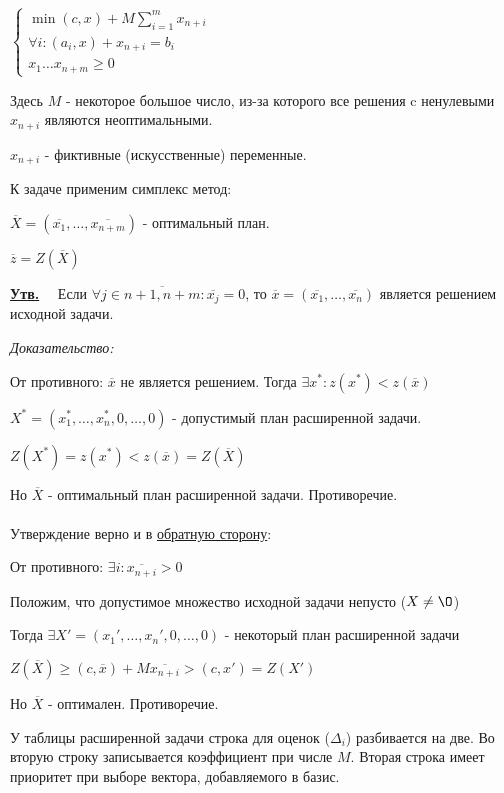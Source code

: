 \documentclass[11pt]{article}
\newenvironment{proof}{
  \textit{Доказательство:}
    
  \begin{adjustwidth}{1em}{}
}{
  \end{adjustwidth}
}
\newenvironment{statement}{
  \underline{\textbf{Утв.}}\ \ }{
  
}
\begin{document}
\begin{sloppypar}
$\begin{cases}
  \min (c, x) + M \sum_{i = 1}^m x_{n + i} \\
  \forall i: (a_i, x) + x_{n + i} = b_i \\
  x_1 \dots x_{n + m} \geq 0
\end{cases}$

Здесь $M$ - некоторое большое число, из-за которого все решения c ненулевыми $x_{n + i}$ являются неоптимальными.

$x_{n + i}$ - фиктивные (искусственные) переменные.

К задаче применим симплекс метод:

$\overline{X} = (\overline{x_1}, \dots, \overline{x_{n + m}})$ - оптимальный план.

$\overline{z} = Z(\overline{X})$

\begin{statement}
  Если $\forall j \in \overline{n+1, n+m}: \overline{x_j} = 0$, то $\overline{x} = (\overline{x_1}, \dots, \overline{x_n})$ является решением исходной задачи.
\end{statement}
\begin{proof}
  От противного: $\overline{x}$ не является решением. Тогда $\exists x^*: z(x^*) < z(\overline{x})$
  
  $X^* = (x^*_1, \dots, x^*_n, 0, \dots, 0)$ - допустимый план расширенной задачи.
  
  $Z(X^*) = z(x^*) < z(\overline{x}) = Z(\overline{X})$
  
  Но $\overline{X}$ - оптимальный план расширенной задачи. Противоречие.\\~\\
  
  Утверждение верно и в \underline{обратную сторону}:
  
  От противного: $\exists i: \overline{x_{n + i}} > 0$
  
  Положим, что допустимое множество исходной задачи непусто ($X \neq \O$)
  
  Тогда $\exists X' = (x_1', \dots, x_n', 0, \dots, 0)$ - некоторый план расширенной задачи
  
  $Z(\overline{X}) \geq (c, \overline{x}) + M \overline{x_{n + i}} > (c, x') = Z(X')$
  
  Но $\overline{X}$ - оптимален. Противоречие.
\end{proof}

У таблицы расширенной задачи строка для оценок ($\Delta_i$) разбивается на две. Во вторую строку записывается коэффициент при числе $M$. Вторая строка имеет приоритет при выборе вектора, добавляемого в базис.

\end{sloppypar}
\end{document}
